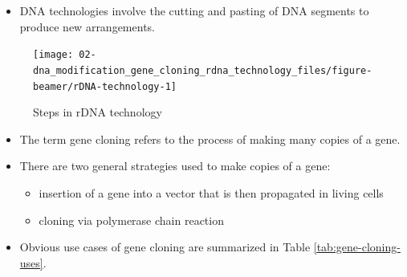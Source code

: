 \documentclass[
  ignorenonframetext,
  aspectratio=169]{beamer}
\providecommand{\tightlist}{%
  \setlength{\itemsep}{0pt}\setlength{\parskip}{0pt}}
\begin{document}
\begin{frame}{}
\protect\hypertarget{section}{}
\begin{itemize}
\tightlist
\item
  DNA technologies involve the cutting and pasting of DNA segments to
  produce new arrangements.
\end{itemize}

\begin{figure}[H]
\texttt{[image: 02-dna\_modification\_gene\_cloning\_rdna\_technology\_files/figure-beamer/rDNA-technology-1]} \caption{Steps in rDNA technology}\label{fig:rDNA-technology}
\end{figure}
\end{frame}

\begin{frame}{}
\protect\hypertarget{section-1}{}
\begin{itemize}
\tightlist
\item
  The term gene cloning refers to the process of making many copies of a
  gene.
\item
  There are two general strategies used to make copies of a gene:

  \begin{itemize}
  \tightlist
  \item
    insertion of a gene into a vector that is then propagated in living
    cells
  \item
    cloning via polymerase chain reaction
  \end{itemize}
\item
  Obvious use cases of gene cloning are summarized in Table
  \ref{tab:gene-cloning-uses}.
\end{itemize}

\begin{table}


\end{table}
\end{frame}
\end{document}
